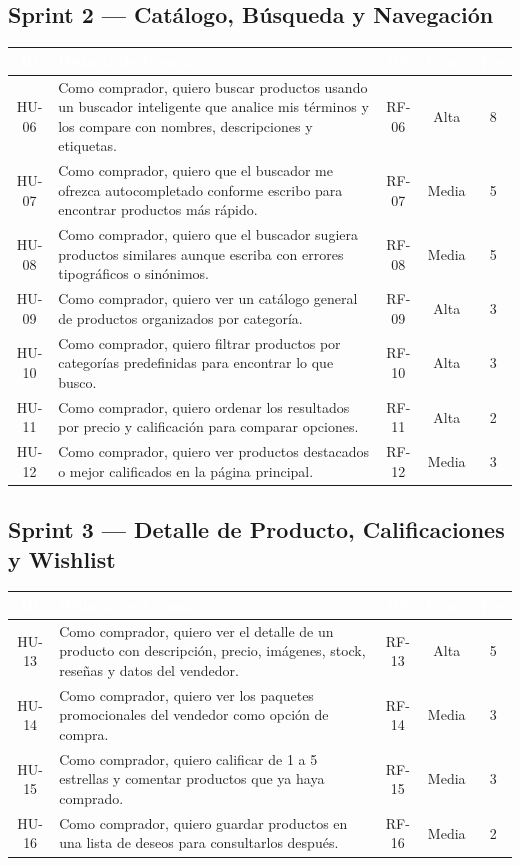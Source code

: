 \documentclass[12pt,a4paper]{article}
\begin{document}
\subsection{Sprint 2 --- Catálogo, Búsqueda y Navegación}
\begin{longtable}{|c|p{8cm}|c|c|c|}
\hline
\rowcolor{darkbg}\textcolor{white}{\textbf{ID}} & \textcolor{white}{\textbf{Historia de Usuario}} & \textcolor{white}{\textbf{RF}} & \textcolor{white}{\textbf{Prior.}} & \textcolor{white}{\textbf{Pts}} \\
\hline
HU-06 & Como comprador, quiero buscar productos usando un buscador inteligente que analice mis términos y los compare con nombres, descripciones y etiquetas. & RF-06 & Alta & 8 \\
\hline
HU-07 & Como comprador, quiero que el buscador me ofrezca autocompletado conforme escribo para encontrar productos más rápido. & RF-07 & Media & 5 \\
\hline
HU-08 & Como comprador, quiero que el buscador sugiera productos similares aunque escriba con errores tipográficos o sinónimos. & RF-08 & Media & 5 \\
\hline
HU-09 & Como comprador, quiero ver un catálogo general de productos organizados por categoría. & RF-09 & Alta & 3 \\
\hline
HU-10 & Como comprador, quiero filtrar productos por categorías predefinidas para encontrar lo que busco. & RF-10 & Alta & 3 \\
\hline
HU-11 & Como comprador, quiero ordenar los resultados por precio y calificación para comparar opciones. & RF-11 & Alta & 2 \\
\hline
HU-12 & Como comprador, quiero ver productos destacados o mejor calificados en la página principal. & RF-12 & Media & 3 \\
\hline
\end{longtable}

\subsection{Sprint 3 --- Detalle de Producto, Calificaciones y Wishlist}
\begin{longtable}{|c|p{8cm}|c|c|c|}
\hline
\rowcolor{darkbg}\textcolor{white}{\textbf{ID}} & \textcolor{white}{\textbf{Historia de Usuario}} & \textcolor{white}{\textbf{RF}} & \textcolor{white}{\textbf{Prior.}} & \textcolor{white}{\textbf{Pts}} \\
\hline
HU-13 & Como comprador, quiero ver el detalle de un producto con descripción, precio, imágenes, stock, reseñas y datos del vendedor. & RF-13 & Alta & 5 \\
\hline
HU-14 & Como comprador, quiero ver los paquetes promocionales del vendedor como opción de compra. & RF-14 & Media & 3 \\
\hline
HU-15 & Como comprador, quiero calificar de 1 a 5 estrellas y comentar productos que ya haya comprado. & RF-15 & Media & 3 \\
\hline
HU-16 & Como comprador, quiero guardar productos en una lista de deseos para consultarlos después. & RF-16 & Media & 2 \\
\hline
\end{longtable}
\end{document}

